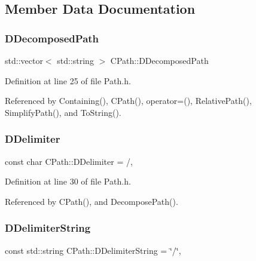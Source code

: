 \subsection{Member Data Documentation}
\hypertarget{classCPath_a03ed25209a01e633c107a0c877fc61f8}{}\label{classCPath_a03ed25209a01e633c107a0c877fc61f8} 
\subsubsection{\texorpdfstring{D\+Decomposed\+Path}{DDecomposedPath}}
{\footnotesize\ttfamily std\+::vector$<$ std\+::string $>$ C\+Path\+::\+D\+Decomposed\+Path\hspace{0.3cm}{\ttfamily [protected]}}



Definition at line 25 of file Path.\+h.



Referenced by Containing(), C\+Path(), operator=(), Relative\+Path(), Simplify\+Path(), and To\+String().

\hypertarget{classCPath_a4af2d74fc7695c4de8900dcc426530b5}{}\label{classCPath_a4af2d74fc7695c4de8900dcc426530b5} 
\subsubsection{\texorpdfstring{D\+Delimiter}{DDelimiter}}
{\footnotesize\ttfamily const char C\+Path\+::\+D\+Delimiter = \textquotesingle{}/\textquotesingle{}\hspace{0.3cm}{\ttfamily [static]}, {\ttfamily [protected]}}



Definition at line 30 of file Path.\+h.



Referenced by C\+Path(), and Decompose\+Path().

\hypertarget{classCPath_a88b8652d01ff3359a48dd75126cc5776}{}\label{classCPath_a88b8652d01ff3359a48dd75126cc5776} 
\subsubsection{\texorpdfstring{D\+Delimiter\+String}{DDelimiterString}}
{\footnotesize\ttfamily const std\+::string C\+Path\+::\+D\+Delimiter\+String = \char`\"{}/\char`\"{}\hspace{0.3cm}{\ttfamily [static]}, {\ttfamily [protected]}}



